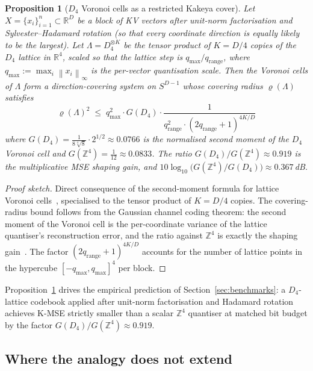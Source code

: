 \documentclass[11pt,a4paper]{article}
\theoremstyle{definition}
\theoremstyle{plain}
\newtheorem{proposition}[theorem]{Proposition}
\newcommand{\R}{\mathbb{R}}
\newcommand{\Z}{\mathbb{Z}}
\newcommand{\norm}[1]{\left\lVert#1\right\rVert}
\begin{document}
\begin{proposition}[$D_4$ Voronoi cells as a restricted Kakeya cover]
\label{prop:d4-kakeya}
Let $X = \{x_i\}_{i=1}^n \subset \R^D$ be a block of KV vectors after
unit-norm factorisation and Sylvester--Hadamard rotation (so that
every coordinate direction is equally likely to be the largest). Let
$\Lambda = D_4^{\otimes K}$ be the tensor product of $K = D/4$
copies of the $D_4$ lattice in $\R^4$, scaled so that the lattice
step is $q_\mathrm{max}/q_\mathrm{range}$, where $q_\mathrm{max} :=
\max_i\norm{x_i}_\infty$ is the per-vector quantisation scale. Then
the Voronoi cells of $\Lambda$ form a direction-covering system on
$S^{D-1}$ whose covering radius $\varrho(\Lambda)$ satisfies
\begin{equation}
\varrho(\Lambda)^2 \;\leq\; q_\mathrm{max}^2 \cdot G(D_4) \cdot \frac{1}{q_\mathrm{range}^2 \cdot (2 q_\mathrm{range} + 1)^{4K/D}}
\end{equation}
where $G(D_4) = \tfrac{1}{8\sqrt[4]{8}}\cdot 2^{1/2}\approx 0.0766$
is the normalised second moment of the $D_4$ Voronoi cell and
$G(\Z^4)=\tfrac{1}{12}\approx 0.0833$. The ratio
$G(D_4)/G(\Z^4)\approx 0.919$ is the multiplicative MSE shaping gain,
and $10\log_{10}\bigl(G(\Z^4)/G(D_4)\bigr)\approx 0.367\,$dB.
\end{proposition}

\begin{proof}[Proof sketch]
Direct consequence of the second-moment formula for lattice Voronoi
cells~\cite{conway-sloane-book}, specialised to the tensor product of
$K = D/4$ copies. The covering-radius bound follows from the Gaussian
channel coding theorem: the second moment of the Voronoi cell is the
per-coordinate variance of the lattice quantiser's reconstruction
error, and the ratio against $\Z^4$ is exactly the shaping
gain~\cite{zamir-feder,eyuboglu-forney,erez-zamir}. The factor
$(2q_\mathrm{range}+1)^{4K/D}$ accounts for the number of lattice
points in the hypercube $[-q_\mathrm{max},q_\mathrm{max}]^4$ per block.
\end{proof}

Proposition~\ref{prop:d4-kakeya} drives the empirical prediction of
Section~\ref{sec:benchmarks}: a $D_4$-lattice codebook applied after
unit-norm factorisation and Hadamard rotation achieves K-MSE
strictly smaller than a scalar $\Z^4$ quantiser at matched bit
budget by the factor $G(D_4)/G(\Z^4) \approx 0.919$.

\subsection{Where the analogy does not extend}
\end{document}

